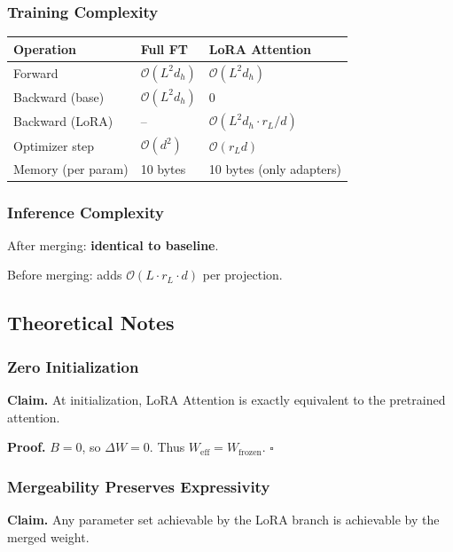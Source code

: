 \subsubsection{Training Complexity}

\begin{table}[H]
\centering
\small
\begin{tabular}{lll}
\toprule
\textbf{Operation} & \textbf{Full FT} & \textbf{LoRA Attention} \\
\midrule
Forward & $\mathcal{O}(L^2 d_h)$ & $\mathcal{O}(L^2 d_h)$ \\
Backward (base) & $\mathcal{O}(L^2 d_h)$ & 0 \\
Backward (LoRA) & -- & $\mathcal{O}(L^2 d_h \cdot r_L/d)$ \\
Optimizer step & $\mathcal{O}(d^2)$ & $\mathcal{O}(r_L d)$ \\
Memory (per param) & 10 bytes & 10 bytes (only adapters) \\
\bottomrule
\end{tabular}
\end{table}

\subsubsection{Inference Complexity}

After merging: \textbf{identical to baseline}.

Before merging: adds $\mathcal{O}(L \cdot r_L \cdot d)$ per projection.

\subsection{Theoretical Notes}

\subsubsection{Zero Initialization}

\textbf{Claim.} At initialization, LoRA Attention is exactly equivalent to the 
pretrained attention.

\textbf{Proof.} $B = 0$, so $\Delta W = 0$. Thus $W_\text{eff} = W_\text{frozen}$. $\square$

\subsubsection{Mergeability Preserves Expressivity}

\textbf{Claim.} Any parameter set achievable by the LoRA branch is achievable 
by the merged weight.

